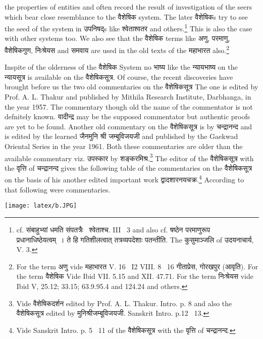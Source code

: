 \documentclass[11pt, openany]{book}
\begin{document}
\newpage
\noindent
the properties of entities and often record the result of investigation of the seers which bear close resemblance to the वैशेषिक system. The later वैशेषिकs try to see the seed of the system in उपनिषद्s like श्वेताश्वतर and others.\renewcommand{\thefootnote}{1}\footnote{cf. संबाहुभ्यां धमति संपतत्रैः \textendash\ श्वेताश्च. III \textendash\ 3 and also cf. षष्ठेन परमाणुरूप प्रधानाधिष्ठेयत्वम्~। ते हि गतिशीलत्वात् तत्रव्यपदेशाः पतन्तीति. The कुसुमाञ्जलि of उदयनाचार्य, V. 3.} This is also the case with other systems too. We also see that the वैशेषिक terms like अणु, परमाणु, वैशेषिकगुण, निःश्रेयस and समवाय are used in the old texts of the महाभारत also.\renewcommand{\thefootnote}{2}\footnote{For the term अणु vide महाभारत V. 16 \textendash\ I2 VIII. 8 \textendash\ 16 गीताप्रेस, गोरखपुर (आवृति). For the term वैशेषिक Vide Ibid VII. 5.15 and XII. 47.71. For the term निःश्रेयस vide Ibid V, 25.12; 33.15; 63.9.95.4 and 124.24 and others.}

Inspite of the olderness of the वैशेषिक System no भाष्य like the न्यायभाष्य on the न्यायसूत्र is available on the वैशेषिकसूत्र. Of course, the recent discoveries have brought before us the two old commentaries on the वैशेषिकसूत्र The one is edited by Prof. A. L. Thakur and published by Mithila Research Institute, Darbhanga, in the year 1957. The commentary though old the name of the commentator is not defnitely known. वादीन्द्र may be the supposed commentator but authentic proofs are yet to be found. Another old commentary on the वैशेषिकसूत्र is by चन्द्रानन्द and is edited by the learned जैनमुनि श्री जम्बूविजयजी and published by the Gaekwad Oriental Series in the year 1961. Both these commentaries are older than the available commentary viz. उपस्कार by शङ्करमिश्र.\renewcommand{\thefootnote}{3}\footnote{Vide वैशेषिकदर्शन edited by Prof. A. L. Thakur. Intro. p. 8 and also the वैशेषिकसूत्र edited by मुनिश्रीजम्बूविजयजी. Sanskrit Intro. p.12 \textendash\ 13.} The editor of the वैशेषिकसूत्र with the वृत्ति of चन्द्रानन्द gives the following table of the commentaries on the वैशेषिकसूत्र on the basis of his another edited important work द्वादशारनयचक्र.\renewcommand{\thefootnote}{4}\footnote{Vide Sanskrit Intro. p. 5 \textendash\ 11 of the वैशेषिकसूत्र with the वृत्ति of चन्द्रानन्द.} According to that following were commentaries.

\begin{center}
\texttt{[image: latex/b.JPG]}
\end{center}
\end{document}
